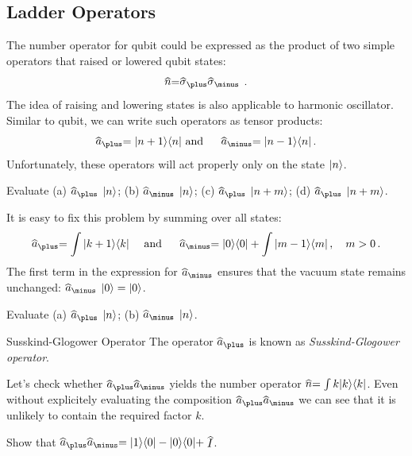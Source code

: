 \subsection{Ladder Operators}
The number operator for qubit could be expressed as the product of two simple operators that raised or lowered qubit states:
\[
\op{n} = \op{\sigma}_\plus\op{\sigma}_\minus\,.
\]
The idea of raising and lowering states is also applicable to harmonic oscillator. Similar to qubit, we can write such operators as tensor products:
\[
\op{a}_\plus = \ketbra{n+1}{n}\textrm{ and }\quad\op{a}_\minus=\ketbra{n-1}{n}\,.
\]
Unfortunately, these operators will act properly only on the state $|{n}\rangle$.
\begin{exercise}
	Evaluate (a) $\op{a}_\plus \,\ket{n}$; (b) $\op{a}_\minus \,\ket{n}$; (c) $\op{a}_\plus \,\ket{n+m}$; (d) $\op{a}_\plus \,\ket{n+m}$.
\end{exercise}
It is easy to fix this problem by summing over all states:
\[
\op{a}_\plus=\int \ketbra{k+1}{k}\quad\textrm{ and }\quad \op{a}_\minus=\ketbra{0}{0}+\int \ketbra{m-1}{m}\,,\quad m > 0\,.
\]
The first term in the expression for $\op{a}_\minus$ ensures that the vacuum state remains unchanged: $\op{a}_\minus\,\ket{0}=\ket{0}$.
\begin{exercise}
	Evaluate (a) $\op{a}_\plus \,\ket{n}$; (b) $\op{a}_\minus \,\ket{n}$.
\end{exercise}

\begin{myrem}{Susskind-Glogower Operator}
	The operator $\op{a}_\plus$ is known as \emph{Susskind-Glogower operator}.
\end{myrem}


Let's check whether $\op{a}_\plus\op{a}_\minus$ yields the number operator $\op{n}=\int k\ketbra{k}{k}$. Even without explicitely evaluating the composition $\op{a}_\plus\op{a}_\minus$ we can see that it is unlikely to contain the required factor $k$.
\begin{exercise}
	Show that $\op{a}_\plus\op{a}_\minus=\ketbra{1}{0}-\ketbra{0}{0}+\op{I}$.
\end{exercise}

